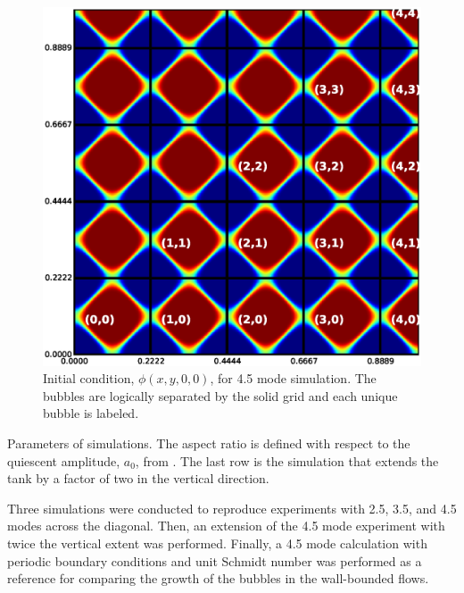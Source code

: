\begin{figure}
\includegraphics[width=\columnwidth]{figs/cells}
\caption{  
Initial condition, $\phi(x,y,0,0)$, for 4.5 mode simulation.  
The bubbles are logically separated by the solid grid and each unique bubble is labeled.
}
\end{figure}

\begin{table}
\begin{center}

\end{center}
\caption{ 
Parameters of simulations.
The aspect ratio is defined with respect to the quiescent amplitude, $a_0$, from .
The last row is the simulation that extends the tank by a factor of two in the vertical direction.
}
\end{table}

Three simulations were conducted to reproduce experiments with 2.5, 3.5, and 4.5 modes across the diagonal.
Then, an extension of the 4.5 mode experiment with twice the vertical extent was performed.
Finally, a 4.5 mode calculation with periodic boundary conditions and unit Schmidt number was performed as a reference for comparing the growth of the bubbles in the wall-bounded flows.

